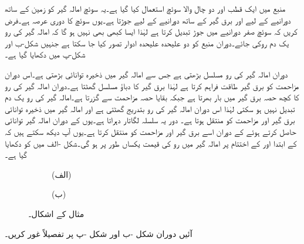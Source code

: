 منبع میں ایک قطب اور دو چال والا سوئچ استعمال کیا گیا ہے۔یہ سوئچ امالہ گیر کو زمین کے ساتھ  دورانیے کے لیے اور برق گیر کے ساتھ  دورانیے کے لیے جوڑتا ہے۔یوں سوئچ کا دوری عرصہ  ہے۔فرض کریں کہ سوئچ صفر دورانیے میں جوڑ تبدیل کرتا ہے لہٰذا ایسا کبھی بھی نہیں ہو گا کہ امالہ گیر کی رو یک دم روکی جائے۔دوران  منبع کو دو علیحدہ علیحدہ ادوار تصور کیا جا سکتا ہے جنہیں شکل-ب اور شکل-پ میں دکھایا گیا ہے۔

دوران  امالہ گیر کی رو مسلسل بڑھتی ہے جس سے امالہ گیر میں ذخیرہ توانائی  بڑھتی ہے۔اس دوران مزاحمت کو برق گیر طاقت فراہم کرتا ہے لہٰذا برق گیر کا دباؤ مسلسل گھٹتا ہے۔دوران  امالہ گیر کی رو کا کچھ حصہ برق گیر میں بار بھرتا ہے جبکہ بقایا حصہ مزاحمت سے گزرتا ہے۔امالہ گیر کی رو یک دم تبدیل نہیں ہو سکتی لہٰذا اس دوران امالہ گیر کی رو بتدریج گھٹتی ہے اور امالہ گیر میں ذخیرہ توانائی برق گیر اور مزاحمت کو منتقل ہوتا ہے۔ دور یہ سلسلہ لگاتار دہراتا ہے۔یوں  کے دوران امالہ گیر توانائی حاصل کرتے ہوئے  کے دوران اسے برق گیر اور مزاحمت کو منتقل کرتا ہے۔یوں آپ دیکھ سکتے ہیں کہ  کے ابتدا اور  کے اختتام پر امالہ گیر میں رو کی قیمت یکساں طور پر  ہو گی۔شکل -الف میں  کو دکھایا گیا ہے۔
\begin{figure}
\begin{subfigure}{1\textwidth}
\centering
{}
\caption*{(الف)}
\end{subfigure}
%
\begin{subfigure}{1\textwidth}
\centering
{}
\caption*{(ب)}
\end{subfigure}
\caption{مثال  کے اشکال۔}
\label{شکل_عارضی_منبع_چالو_بند_رو}
\end{figure}
آئیں دوران  شکل -ب اور شکل -پ پر تفصیلاً غور کریں۔

